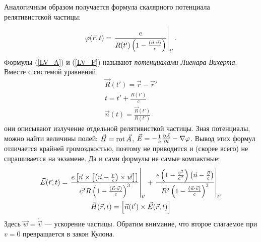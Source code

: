     Аналогичным образом получается формула скалярного потенциала релятивистской частицы:
    \begin{equation}
        \varphi(\vec{r}, t) = \left. \frac{e}{R(t')\left({1 - \frac{\left({\vec{n}\cdot\vec{v}}\right)}{c}}\right)} \right|_{t'}. \label{LV_F}
    \end{equation}
    Формулы (\ref{LV_A}) и (\ref{LV_F}) называют \textit{потенциалами Лиенара-Вихерта}. Вместе с системой уравнений
    \begin{gather*}
        \vec{R}(t') = \vec{r} - \vec{r}'\\
        t = t' + \frac{R(t')}{c}\\
        \vec{n}(t) = \frac{\vec{R}(t')}{R(t')}
    \end{gather*}
    они описывают излучение отдельной релятивисткой частицы. Зная потенциалы, можно найти величины полей: $\vec{H} = \operatorname{rot}\vec{A}$, $\vec{E} = -\frac 1c \frac{\partial\vec{A}}{\partial t} - \nabla\varphi$.
    Вывод этих формул отличается крайней громоздкостью, поэтому не приводится и (скорее всего) не спрашивается на экзамене. Да и сами формулы не самые компактные:
    \begin{gather*}
        \vec{E}(\vec{r}, t) = \left. \frac{e\left[{\vec{n} \times \left[{\left({\vec{n} - \frac{v}{c}}\right) \times \vec{w}}\right]}\right]}{c^2R\left({1 - \frac{\left({\vec{n}\cdot\vec{v}}\right)}{c}}\right)^3} \right|_{t'} +
        \left. \frac{e \left({1 - \frac{v^2}{c^2}}\right) \left({\vec{n} - \frac{\vec{v}}{c}}\right)}{R^2 \left({1 - \frac{\left({\vec{n}\cdot\vec{v}}\right)}{c}}\right)^3} \right|_{t'} \\
        \vec{H}(\vec{r}, t) = \left[{\vec n(t')\times\vec E(\vec{r}, t)}\right]
    \end{gather*}
    Здесь $\vec{w} = \dot{\vec{v}}$ --- ускорение частицы. Обратим внимание, что второе слагаемое при $v = 0$ превращается в закон Кулона.


